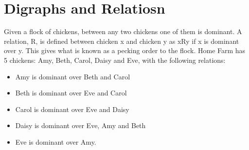 \section{Digraphs and Relatiosn}
Given a flock of chickens, between any two chickens one of them is
dominant. A relation, R, is defined between chicken x and chicken y as xRy if x is
dominant over y. This gives what is known as a pecking order to the flock. Home
Farm has 5 chickens: Amy, Beth, Carol, Daisy and Eve, with the following relations:

\begin{itemize}
\item Amy is dominant over Beth and Carol
\item Beth is dominant over Eve and Carol
\item Carol is dominant over Eve and Daisy
\item Daisy is dominant over Eve, Amy and Beth
\item Eve is dominant over Amy.
\end{itemize}

\newpage
